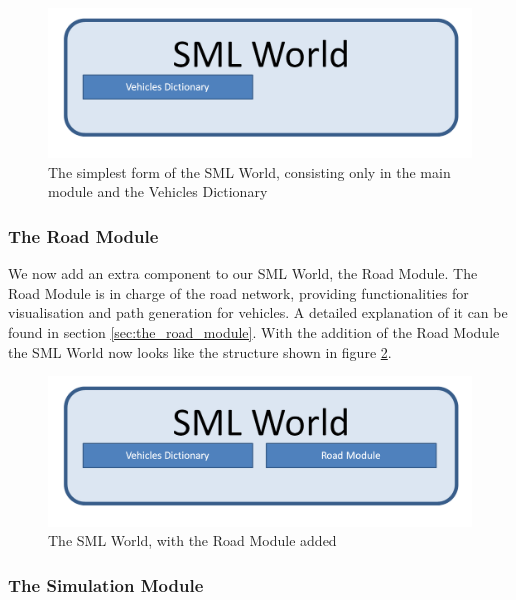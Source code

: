 \begin{figure}[h!]
  \centering
    \includegraphics[width=1.0\textwidth]{sml_world_structure_1}
    \caption{The simplest form of the SML World, consisting only in the main module and the Vehicles Dictionary \label{fig:sml_world_structure_1} }
\end{figure}

\subsubsection{The Road Module}

We now add an extra component to our SML World, the Road Module. The Road Module is in charge of the road network, providing functionalities for visualisation and path generation for vehicles. A detailed explanation of it can be found in section \ref{sec:the_road_module}. With the addition of the Road Module the SML World now looks like the structure shown in figure \ref{fig:sml_world_structure_2}.

\begin{figure}[h!]
  \centering
    \includegraphics[width=1.0\textwidth]{sml_world_structure_2}
    \caption{The SML World, with the Road Module added \label{fig:sml_world_structure_2} }
\end{figure}

\subsubsection{The Simulation Module}

\label{subsubsec:simulation_module}

